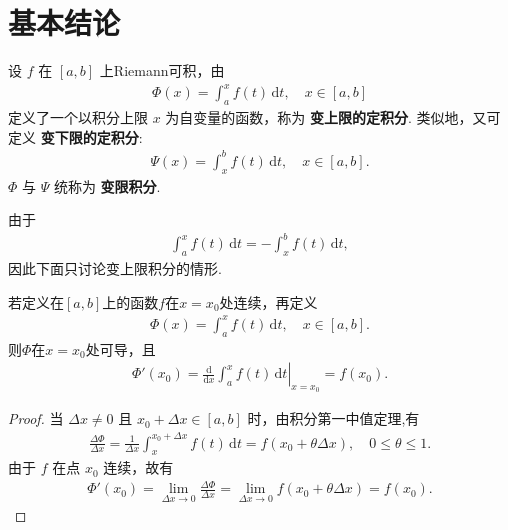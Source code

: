 \documentclass[../../main.tex]{subfiles}%
\begin{document}
\section{基本结论}

\begin{definition}
设 $f$ 在 $[a,b]$ 上Riemann可积，由
\begin{align*}
\Phi(x)=\int_a^x f(t)\,\mathrm{d}t,\quad x\in[a,b]
\end{align*}
定义了一个以积分上限 $x$ 为自变量的函数，称为 \textbf{变上限的定积分}. 类似地，又可定义 \textbf{变下限的定积分}:
\begin{align}
\Psi(x)=\int_x^b f(t)\,\mathrm{d}t,\quad x\in[a,b]. \label{eq:PsiDef}
\end{align}
$\Phi$ 与 $\Psi$ 统称为 \textbf{变限积分}. 
\end{definition}
\begin{remark}
由于
\begin{align*}
\int_a^x f(t)\,\mathrm{d}t=-\int_x^b f(t)\,\mathrm{d}t,
\end{align*}
因此下面只讨论变上限积分的情形.
\end{remark}

\begin{theorem}[变限积分求导定理]\label{theorem:变限积分求导定理}
若定义在$[a,b]$上的函数$f$在$x=x_0$处连续，再定义
\begin{align*}
\Phi(x)=\int_a^x f(t)\,\mathrm{d}t,\quad x\in[a,b].
\end{align*}
则$\Phi$在$x=x_0$处可导，且
\begin{align*}
\Phi'(x_0)=\left.\frac{\mathrm{d}}{\mathrm{d}x}\int_a^x f(t)\,\mathrm{d}t\right|_{x=x_0}=f(x_0). 
\end{align*}
\end{theorem}
\begin{proof}
当 $\Delta x\neq 0$ 且 $x_0+\Delta x\in[a,b]$ 时，由积分第一中值定理,有
\begin{align*}
\frac{\Delta \Phi}{\Delta x}=\frac{1}{\Delta x}\int_x^{x_0+\Delta x} f(t)\,\mathrm{d}t=f(x_0+\theta\Delta x),\quad 0\leqslant\theta\leqslant 1.
\end{align*}
由于 $f$ 在点 $x_0$ 连续，故有
\begin{align*}
\Phi'(x_0)=\lim_{\Delta x\to 0}\frac{\Delta \Phi}{\Delta x}
=\lim_{\Delta x\to 0} f(x_0+\theta\Delta x)=f(x_0).
\end{align*}
\end{proof}
\end{document}
